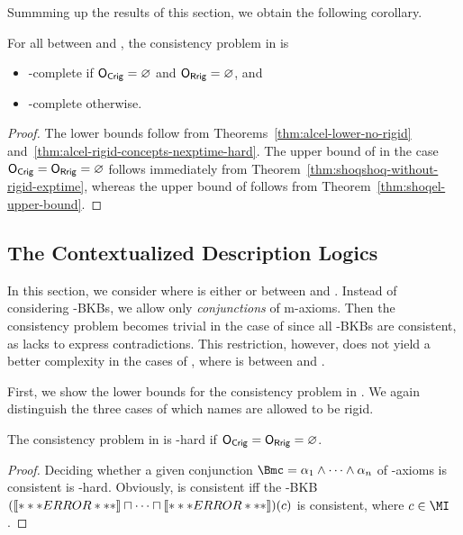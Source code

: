 Summming up the results of this section, we obtain the following corollary.

\begin{corollary}
  For all \LM between \ALC and \SHOQ, the consistency problem in \LMEL is
    \begin{itemize}
        \item \ExpTime-complete if $\OCR=\emptyset$ and $\ORR=\emptyset$, and
        \item \NExpTime-complete otherwise.
    \end{itemize}
\end{corollary}

\begin{proof}
  The lower bounds follow from Theorems~\ref{thm:alcel-lower-no-rigid}
  and~\ref{thm:alcel-rigid-concepts-nexptime-hard}.  The upper bound of \ExpTime in the case
  $\OCR=\ORR=\emptyset$ follows immediately from Theorem~\ref{thm:shoqshoq-without-rigid-exptime},
  whereas the upper bound of \NExpTime follows from Theorem~\ref{thm:shoqel-upper-bound}.
\end{proof}

\subsection{The Contextualized Description Logics \texorpdfstring{\ELLO}{EL[LO]}}
\label{sec:dlouter-el}

In this section, we consider \ELLO where \LO is either \EL or between \ALC and \SHOQ.
%
Instead of considering \ELLO-BKBs, we allow only \emph{conjunctions} of m-axioms.   Then the consistency problem becomes trivial in the case of \ELEL since all
\ELEL-BKBs are consistent, as \EL lacks to express contradictions.
%
This restriction, however, does not yield a better complexity in the cases of \ELLO, where \LO is
between \ALC and \SHOQ.

First, we show the lower bounds for the consistency problem in \ELALC.  We again distinguish the
three cases of which names are allowed to be rigid.

\begin{theorem}\label{thm:el-lower-exp}
  The consistency problem in \ELALC is \ExpTime-hard if $\OCR = \ORR = \emptyset$.
\end{theorem}

\begin{proof}
  Deciding whether a given conjunction $\B = \alpha_{1} \land \dots \land \alpha_{n}$ of \ALC-axioms
  is consistent is \ExpTime-hard\cite{Sch-IJCAI91}.  Obviously, \B is consistent iff the \ELALC-BKB
  $(\oax{\alpha_{1}} \sqcap \dots \sqcap \oax{\alpha_{n}})(c)$ is consistent, where $c\in\MI$.
\end{proof}

